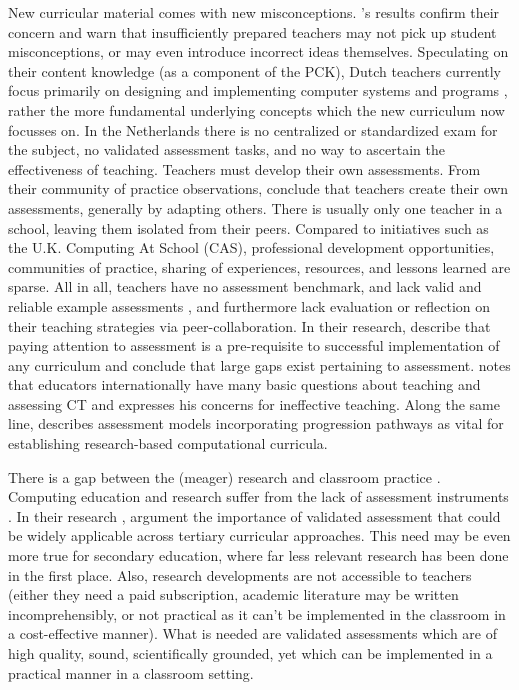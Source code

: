 New curricular material comes with new misconceptions. \citeauthor{duncan2017teachers}'s results confirm their concern and warn that insufficiently prepared teachers may not pick up student misconceptions, or may even introduce incorrect ideas themselves. Speculating on their content knowledge (as a component of the PCK), Dutch teachers currently focus primarily on designing and implementing computer systems and programs \cite{Schmidt2007}, rather the more fundamental underlying concepts which the new curriculum now focusses on. In the Netherlands there is no centralized or standardized exam for the subject, no validated assessment tasks, and no way to ascertain the effectiveness of teaching. Teachers must develop their own assessments. From their community of practice observations,  conclude that teachers create their own assessments, generally by adapting others. There is usually only one teacher in a school, leaving them isolated from their peers. Compared to initiatives such as the U.K. Computing At School (CAS), professional development opportunities, communities of practice, sharing of experiences, resources, and lessons learned are sparse. All in all, teachers have no assessment benchmark, and lack valid and reliable example assessments \cite{Yadav2015}, and furthermore lack evaluation or reflection on their teaching strategies via peer-collaboration. In their research,  describe that paying attention to assessment is a pre-requisite to successful implementation of any curriculum and conclude that large gaps exist pertaining to assessment.  notes that educators internationally have many basic questions about teaching and assessing CT and expresses his concerns for ineffective teaching. Along the same line,  describes assessment models incorporating progression pathways as vital for establishing research-based computational curricula.


There is a gap between the (meager) research and classroom practice \cite{Yadav2015}. Computing education and research suffer from the lack of assessment instruments \cite{voogt2017effecten}. In their research , argument the importance of validated assessment that could be widely applicable across tertiary curricular approaches. This need may be even more true for secondary education, where far less relevant research has been done in the first place. Also, research developments are not accessible to teachers (either they need a paid subscription, academic literature may be written incomprehensibly, or not practical as it can't be implemented in the classroom in a cost-effective manner). What is needed are validated assessments which are of high quality, sound, scientifically grounded, yet which can be implemented in a practical manner in a classroom setting.

